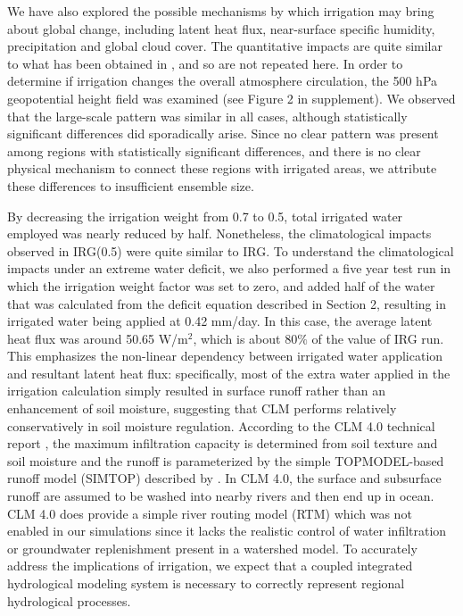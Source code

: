 We have also explored the possible mechanisms by which irrigation may bring about global change, including latent heat flux, near-surface specific humidity, precipitation and global cloud cover. The quantitative impacts are quite similar to what has been obtained in \cite{sacks2009effects}, and so are not repeated here. In order to determine if irrigation changes the overall atmosphere circulation, the 500 hPa geopotential height field was examined (see Figure 2 in supplement).  We observed that the large-scale pattern was similar in all cases, although statistically significant differences did sporadically arise. Since no clear pattern was present among regions with statistically significant differences, and there is no clear physical mechanism to connect these regions with irrigated areas, we attribute these differences to insufficient ensemble size.


By decreasing the irrigation weight from 0.7 to 0.5, total irrigated water employed was nearly reduced by half. Nonetheless, the climatological impacts observed in IRG(0.5) were quite similar to IRG. To understand the climatological impacts under an extreme water deficit, we also performed a five year test run in which the irrigation weight factor was set to zero, and added half of the water that was calculated from the deficit equation described in Section 2, resulting in irrigated water being applied at 0.42 mm/day. In this case, the average latent heat flux was around 50.65 W/m$^2$, which is about 80$\%$ of the value of IRG run.  This emphasizes the non-linear dependency between irrigated water application and resultant latent heat flux: specifically, most of the extra water applied in the irrigation calculation simply resulted in surface runoff rather than an enhancement of soil moisture, suggesting that CLM performs relatively conservatively in soil moisture regulation. According to the CLM 4.0 technical report \cite{CLM40Tech}, the maximum infiltration capacity is determined from soil texture and soil moisture \cite{entekhabi1989land} and the runoff is parameterized by the simple TOPMODEL-based \cite{beven1979physically} runoff model (SIMTOP) described by \cite{niu2005simple}. In CLM 4.0, the surface and subsurface runoff are assumed to be washed into nearby rivers and then end up in ocean.  CLM 4.0 does provide a simple river routing model (RTM) which was not enabled in our simulations since it lacks the realistic control of water infiltration or groundwater replenishment present in a watershed model. To accurately address the implications of irrigation, we expect that a coupled integrated hydrological modeling system is necessary to correctly represent regional hydrological processes.



